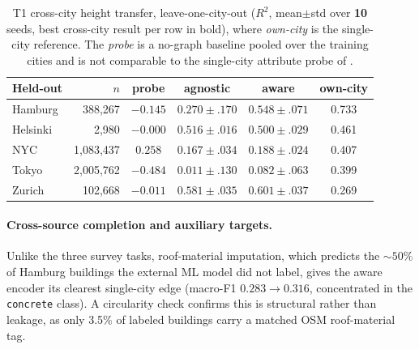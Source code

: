\documentclass[sigconf,authordraft]{acmart}
\begin{document}
\begin{table}[t]
  \centering
  \caption{T1 cross-city height transfer, leave-one-city-out ($R^2$, mean$\pm$std over \textbf{10} seeds, best cross-city result per row in bold), where \emph{own-city} is the single-city reference. The \emph{probe} is a no-graph baseline pooled over the training cities and is not comparable to the single-city attribute probe of .}
  \label{tab:repL-crosscity}
  \small
  \setlength{\tabcolsep}{4pt}
  \begin{tabular}{@{}lrcccc@{}}
    \toprule
    Held-out & $n$ & probe & agnostic & aware & own-city\\
    \midrule
    Hamburg  & 388{,}267     & $-0.145$ & $0.270\pm.170$ & $\mathbf{0.548\pm.071}$ & 0.733\\
    Helsinki & 2{,}980       & $-0.000$ & $\mathbf{0.516\pm.016}$ & $0.500\pm.029$ & 0.461\\
    NYC      & 1{,}083{,}437 & $\mathbf{0.258}$ & $0.167\pm.034$ & $0.188\pm.024$ & 0.407\\
    Tokyo    & 2{,}005{,}762 & $-0.484$ & $0.011\pm.130$ & $\mathbf{0.082\pm.063}$ & 0.399\\
    Zurich   & 102{,}668     & $-0.011$ & $0.581\pm.035$ & $\mathbf{0.601\pm.037}$ & 0.269\\
    \bottomrule
  \end{tabular}
\end{table}

\paragraph{Cross-source completion and auxiliary targets.} Unlike the three survey tasks, roof-material imputation, which predicts the ${\sim}\num{50}\%$ of Hamburg buildings the external ML model did not label, gives the aware encoder its clearest single-city edge (macro-F1 $\num{0.283}\rightarrow\num{0.316}$, concentrated in the \texttt{concrete} class). A circularity check confirms this is structural rather than leakage, as only \num{3.5}\% of labeled buildings carry a matched OSM roof-material tag.

\end{document}
